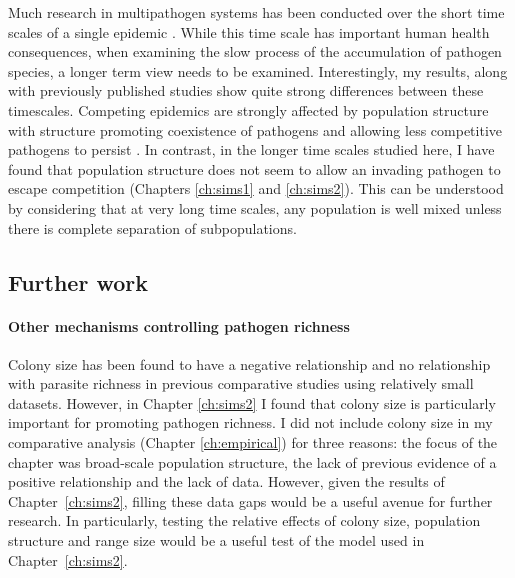 Much research in multipathogen systems has been conducted over the short time scales of a single epidemic \cite{van2014domination, poletto2013host, poletto2015characterising, funk2010interacting}.
While this time scale has important human health consequences, when examining the slow process of the accumulation of pathogen species, a longer term view needs to be examined.
Interestingly, my results, along with previously published studies show quite strong differences between these timescales. 
Competing epidemics are strongly affected by population structure with structure promoting coexistence of pathogens and allowing less competitive pathogens to persist \cite{poletto2013host, poletto2015characterising}.
In contrast, in the longer time scales studied here, I have found that population structure does not seem to allow an invading pathogen to escape competition (Chapters \ref{ch:sims1} and \ref{ch:sims2}).
This can be understood by considering that at very long time scales, any population is well mixed unless there is complete separation of subpopulations.



\subsection{Further work}

\paragraph{Other mechanisms controlling pathogen richness}

Colony size has been found to have a negative relationship \cite{gay2014parasite} and no relationship \cite{turmelle2009correlates} with parasite richness in previous comparative studies using relatively small datasets.
However, in Chapter \ref{ch:sims2} I found that colony size is particularly important for promoting pathogen richness.
I did not include colony size in my comparative analysis (Chapter \ref{ch:empirical}) for three reasons: the focus of the chapter was broad-scale population structure, the lack of previous evidence of a positive relationship \cite{gay2014parasite, turmelle2009correlates} and the lack of data.
However, given the results of Chapter~\ref{ch:sims2}, filling these data gaps would be a useful avenue for further research.
In particularly, testing the relative effects of colony size, population structure and range size would be a useful test of the model used in Chapter~\ref{ch:sims2}.

